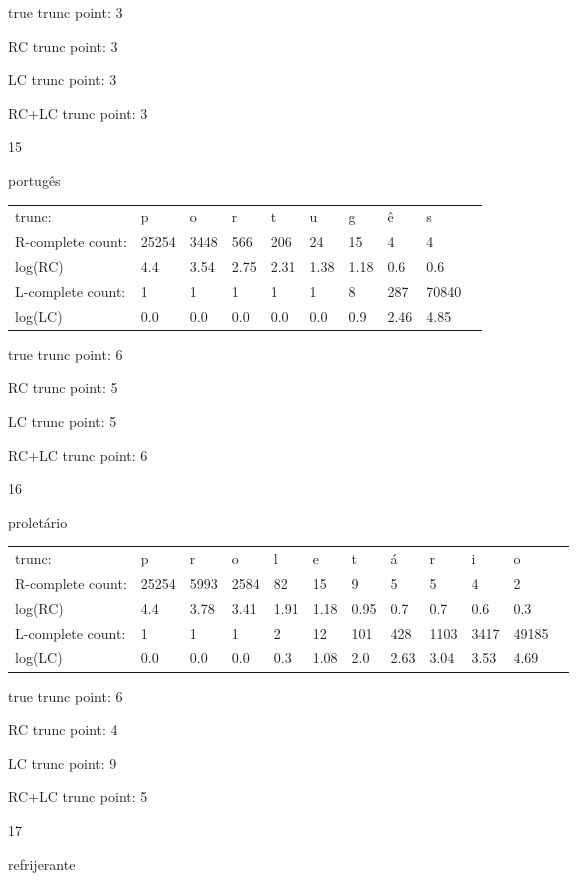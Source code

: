 \documentclass{article}
\begin{document}
true trunc point: 3

RC trunc point: 3

LC trunc point: 3

RC+LC trunc point: 3

\vspace{1em}

15

portugês

\begin{tabular}{l|lllllllll}
trunc: & p & o & r & t & u & g & ê & s & \\ 
R-complete count: & 25254 & 3448 & 566 & 206 & 24 & 15 & 4 & 4 & \\ 
log(RC) & 4.4 & 3.54 & 2.75 & 2.31 & 1.38 & 1.18 & 0.6 & 0.6 & \\ 
L-complete count: & 1 & 1 & 1 & 1 & 1 & 8 & 287 & 70840 & \\ 
log(LC) & 0.0 & 0.0 & 0.0 & 0.0 & 0.0 & 0.9 & 2.46 & 4.85 & \\ 
\end{tabular}

true trunc point: 6

RC trunc point: 5

LC trunc point: 5

RC+LC trunc point: 6

\vspace{1em}

16

proletário

\begin{tabular}{l|lllllllllll}
trunc: & p & r & o & l & e & t & á & r & i & o & \\ 
R-complete count: & 25254 & 5993 & 2584 & 82 & 15 & 9 & 5 & 5 & 4 & 2 & \\ 
log(RC) & 4.4 & 3.78 & 3.41 & 1.91 & 1.18 & 0.95 & 0.7 & 0.7 & 0.6 & 0.3 & \\ 
L-complete count: & 1 & 1 & 1 & 2 & 12 & 101 & 428 & 1103 & 3417 & 49185 & \\ 
log(LC) & 0.0 & 0.0 & 0.0 & 0.3 & 1.08 & 2.0 & 2.63 & 3.04 & 3.53 & 4.69 & \\ 
\end{tabular}

true trunc point: 6

RC trunc point: 4

LC trunc point: 9

RC+LC trunc point: 5

\newpage

17

refrijerante
\end{document}
